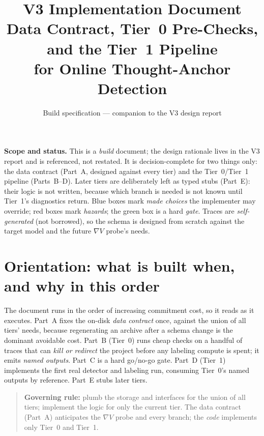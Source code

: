 \documentclass[11pt]{article}
\title{\textbf{V3 Implementation Document}\\[2pt]
\large Data Contract, Tier~0 Pre-Checks, and the Tier~1 Pipeline\\
for Online Thought-Anchor Detection}
\author{Build specification --- companion to the V3 design report}
\date{}
\begin{document}
\maketitle

\begin{honest}
\textbf{Scope and status.} This is a \emph{build} document; the design rationale
lives in the V3 report and is referenced, not restated. It is decision-complete
for two things only: the data contract (Part~A, designed against every tier) and
the Tier~0/Tier~1 pipeline (Parts~B--D). Later tiers are deliberately left as typed
stubs (Part~E): their logic is not written, because which branch is needed is not
known until Tier~1's diagnostics return. Blue boxes mark \emph{made choices} the
implementer may override; red boxes mark \emph{hazards}; the green box is a hard
\emph{gate}. Traces are \emph{self-generated} (not borrowed), so the schema is
designed from scratch against the target model and the future $\nabla V$ probe's
needs.
\end{honest}

\tableofcontents

\section{Orientation: what is built when, and why in this order}
\label{sec:orient}

The document runs in the order of increasing commitment cost, so it reads as it
executes. Part~A fixes the on-disk \emph{data contract} once, against the union of
all tiers' needs, because regenerating an archive after a schema change is the
dominant avoidable cost. Part~B (Tier~0) runs cheap checks on a handful of traces
that can \emph{kill or redirect} the project before any labeling compute is spent;
it emits \emph{named outputs}. Part~C is a hard go/no-go gate. Part~D (Tier~1)
implements the first real detector and labeling run, consuming Tier~0's named
outputs by reference. Part~E stubs later tiers.

\begin{quote}\small
\textbf{Governing rule:} plumb the storage and interfaces for the union of all
tiers; implement the logic for only the current tier. The data contract (Part~A)
anticipates the $\nabla V$ probe and every branch; the \emph{code} implements only
Tier~0 and Tier~1.
\end{quote}

\end{document}
